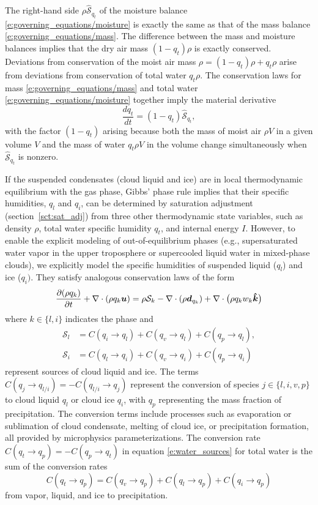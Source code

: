 \documentclass{report}
\begin{document}
The right-hand side $\rho \mathcal{\hat S}_{q_t}$ of the moisture balance \eqref{e:governing_equations/moisture} is exactly the same as that of the mass balance \eqref{e:governing_equations/mass}. The difference between the mass and moisture balances implies that the dry air mass $(1-q_t)\rho$ is exactly conserved. Deviations from conservation of the moist air mass $\rho = (1-q_t)\rho + q_t \rho$ arise from deviations from conservation of total water $q_t\rho$. The conservation laws for mass \eqref{e:governing_equations/mass} and total water \eqref{e:governing_equations/moisture} together imply the material derivative 
\begin{equation}
\frac{dq_t}{dt} = (1-q_t) \mathcal{\hat S}_{q_t},
\end{equation}
with the factor $(1-q_t)$ arising because both the mass of moist air $\rho V$ in a given volume $V$ and the mass of water $q_t \rho V$ in the volume change simultaneously when $\mathcal{\hat S}_{q_t}$ is nonzero.

If the suspended condensates (cloud liquid and ice) are in local thermodynamic equilibrium with the gas phase, Gibbs' phase rule implies that their specific humidities, $q_l$ and $q_i$, can be determined by saturation adjustment (section~\ref{sct:sat_adj}) from three other thermodynamic state variables, such as density $\rho$, total water specific humidity $q_t$, and internal energy $I$. However, to enable the explicit modeling of out-of-equilibrium phases (e.g., supersaturated water vapor in the upper troposphere or supercooled liquid water in mixed-phase clouds), we explicitly model the specific humidities of suspended liquid ($q_l$) and ice ($q_i)$. They satisfy analogous conservation laws of the form
\begin{equation}
\frac{\partial (\rho q_k)}{\partial t} + \nabla \cdot (\rho q_k \boldsymbol{{u}}) = \rho \mathcal{S}_k  -\nabla \cdot (\rho \boldsymbol{{d}}_{q_k}) + \nabla \cdot \bigl(\rho q_k w_k \boldsymbol{{\hat k}} \bigr)  
\label{e:governing_equations/condensate}
\end{equation}
where $k \in \{l, i\}$ indicates the phase and 
\begin{align}
    \mathcal{S}_l & = C(q_i \rightarrow q_l) + C(q_v \rightarrow q_l) + C(q_p \rightarrow q_l), \\
    \mathcal{S}_i & = C(q_l \rightarrow q_i) + C(q_v \rightarrow q_i) + C(q_p \rightarrow q_i)
\end{align}
represent sources of cloud liquid and ice. The terms $C(q_j \rightarrow q_{l/i}) = - C(q_{l/i} \rightarrow q_j)$ represent the conversion of species $j \in \{l, i, v, p\}$ to cloud liquid $q_l$ or cloud ice $q_i$, with $q_p$ representing the mass fraction of precipitation. The conversion terms include processes such as evaporation or sublimation of cloud condensate, melting of cloud ice, or precipitation formation, all provided by microphysics parameterizations. The conversion rate $C(q_t \rightarrow q_p) = -C(q_p \rightarrow q_t)$ in equation \eqref{e:water_sources} for total water is the sum of the conversion rates
\begin{equation}
    C(q_t \rightarrow q_p) = C(q_v \rightarrow q_p) + C(q_l \rightarrow q_p) + C(q_i \rightarrow q_p)
\end{equation}
from vapor, liquid, and ice to precipitation. 
\end{document}
